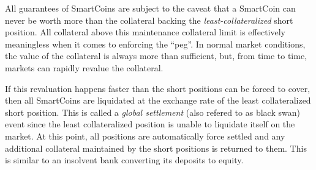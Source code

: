 \label{sec:blackswan}

All guarantees of SmartCoins are subject to the caveat that a SmartCoin can
never be worth more than the collateral backing the \emph{least-collateralized}
short position. All collateral above this maintenance collateral limit is
effectively meaningless when it comes to enforcing the ``peg''. In normal
market conditions, the value of the collateral is always more than sufficient,
but, from time to time, markets can rapidly revalue the collateral.

If this revaluation happens faster than the short positions can be forced to
cover, then all SmartCoins are liquidated at the exchange rate of the least
collateralized short position. This is called a \emph{global settlement} (also refered to as  black swan) event since
the least collateralized position is unable to liquidate itself on the market. At
this point, all positions are automatically force settled and any additional
collateral maintained by the short positions is returned to them. This is similar to an
insolvent bank converting its deposits to equity.
